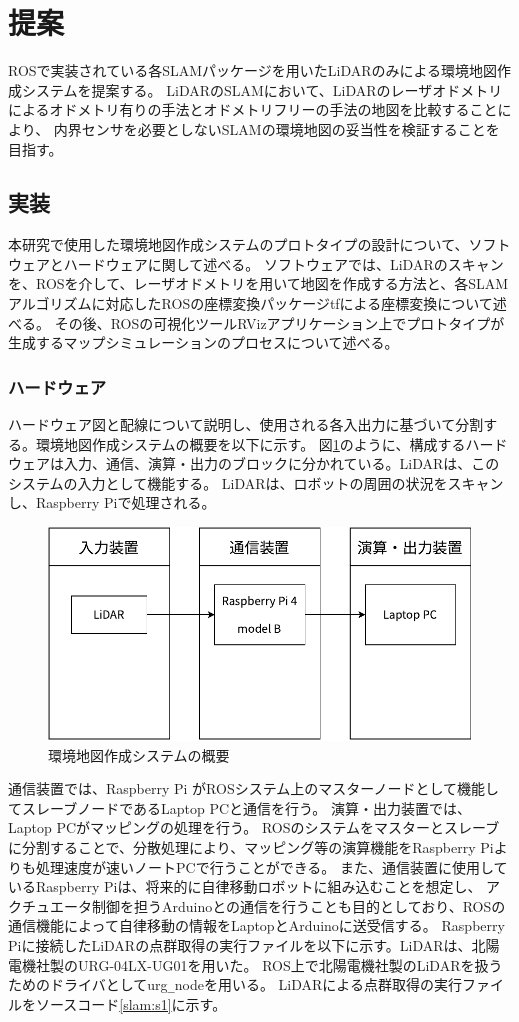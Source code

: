 \section{提案}
ROSで実装されている各SLAMパッケージを用いたLiDARのみによる環境地図作成システムを提案する。
LiDARのSLAMにおいて、LiDARのレーザオドメトリによるオドメトリ有りの手法とオドメトリフリーの手法の地図を比較することにより、
内界センサを必要としないSLAMの環境地図の妥当性を検証することを目指す。

\subsection{実装}
本研究で使用した環境地図作成システムのプロトタイプの設計について、ソフトウェアとハードウェアに関して述べる。
ソフトウェアでは、LiDARのスキャンを、ROSを介して、レーザオドメトリを用いて地図を作成する方法と、各SLAMアルゴリズムに対応したROSの座標変換パッケージtfによる座標変換について述べる。
その後、ROSの可視化ツールRVizアプリケーション上でプロトタイプが生成するマップシミュレーションのプロセスについて述べる。

\subsubsection{ハードウェア}
ハードウェア図と配線について説明し、使用される各入出力に基づいて分割する。環境地図作成システムの概要を以下に示す。
図\ref{slam:hard}のように、構成するハードウェアは入力、通信、演算・出力のブロックに分かれている。LiDARは、このシステムの入力として機能する。
LiDARは、ロボットの周囲の状況をスキャンし、Raspberry Piで処理される。

\begin{figure}[h]
  \begin{center}
  \includegraphics[width=.6\linewidth]{img/slam_21.pdf}
  \caption{環境地図作成システムの概要}
  \label{slam:hard}
  \end{center}
\end{figure}

通信装置では、Raspberry Pi がROSシステム上のマスターノードとして機能してスレーブノードであるLaptop PCと通信を行う。
演算・出力装置では、Laptop PCがマッピングの処理を行う。
ROSのシステムをマスターとスレーブに分割することで、分散処理により、マッピング等の演算機能をRaspberry Piよりも処理速度が速いノートPCで行うことができる。
また、通信装置に使用しているRaspberry Piは、将来的に自律移動ロボットに組み込むことを想定し、
アクチュエータ制御を担うArduinoとの通信を行うことも目的としており、ROSの通信機能によって自律移動の情報をLaptopとArduinoに送受信する。
Raspberry Piに接続したLiDARの点群取得の実行ファイルを以下に示す。LiDARは、北陽電機社製のURG-04LX-UG01を用いた。
ROS上で北陽電機社製のLiDARを扱うためのドライバとしてurg\verb|_|node\cite{slam:urg}を用いる。
LiDARによる点群取得の実行ファイルをソースコード\ref{slam:s1}に示す。

